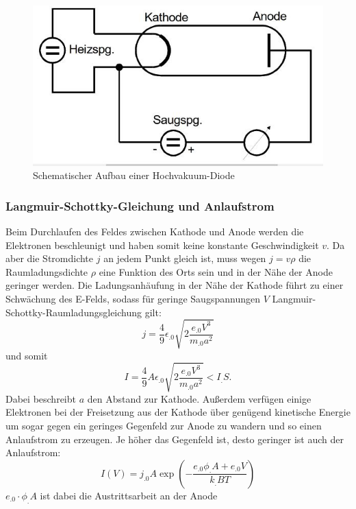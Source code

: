 \begin{figure}
\centering
\includegraphics[width=\linewidth-70pt,height=\textheight-70pt,keepaspectratio]{content/images/HVD.jpg}
\caption{Schematischer Aufbau einer Hochvakuum-Diode\cite{V504}
\label{fig:HVD}}
\end{figure}
\subsubsection{Langmuir-Schottky-Gleichung und Anlaufstrom}
Beim Durchlaufen des Feldes zwischen Kathode und Anode werden die Elektronen beschleunigt und haben somit keine konstante Geschwindigkeit $v$.
Da aber die Stromdichte $j$ an jedem Punkt gleich ist, muss wegen $j=v\rho$
die Raumladungsdichte $\rho$ eine Funktion des Orts sein und in der Nähe der Anode geringer werden. Die Ladungsanhäufung in der Nähe der Kathode führt zu einer Schwächung des E-Felds, sodass für geringe Saugspannungen $V$ Langmuir-Schottky-Raumladungsgleichung gilt:
\begin{equation*}
j = \frac{4}{9}\epsilon_.0\sqrt{2\frac{e_.0V^3}{m_.0a^2}}
\end{equation*}
und somit
\begin{equation}
I = \frac{4}{9}A\epsilon_.0\sqrt{2\frac{e_.0V^3}{m_.0a^2}}<I_.S\text{.}
\label{eq:langmuir}
\end{equation}
Dabei beschreibt $a$ den Abstand zur Kathode.
Außerdem verfügen einige Elektronen bei der Freisetzung aus der Kathode über genügend kinetische Energie um sogar gegen ein geringes Gegenfeld zur Anode zu wandern und so einen Anlaufstrom zu erzeugen.
Je höher das Gegenfeld ist, desto geringer ist auch der Anlaufstrom:
\begin{equation}
I(V)=j_.0A\exp{\left(-\frac{e_.0\phi_.A+e_.0V}{k_.B	T}\right)}
\label{eq:Anlauf}
\end{equation}
$e_.0\cdot\phi_.A$ ist dabei die Austrittsarbeit an der Anode
